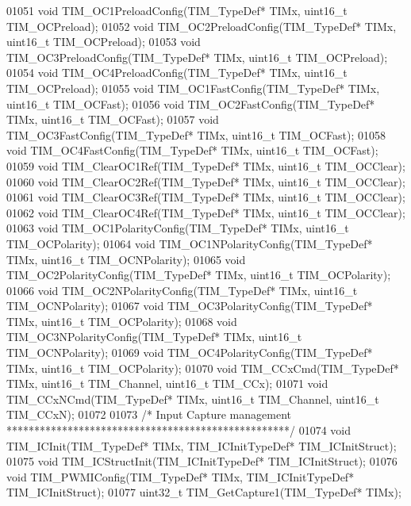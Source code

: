 \begin{DoxyCode}
01051 \textcolor{keywordtype}{void} TIM_OC1PreloadConfig(TIM\_TypeDef* TIMx, uint16\_t TIM\_OCPreload);
01052 \textcolor{keywordtype}{void} TIM_OC2PreloadConfig(TIM\_TypeDef* TIMx, uint16\_t TIM\_OCPreload);
01053 \textcolor{keywordtype}{void} TIM_OC3PreloadConfig(TIM\_TypeDef* TIMx, uint16\_t TIM\_OCPreload);
01054 \textcolor{keywordtype}{void} TIM_OC4PreloadConfig(TIM\_TypeDef* TIMx, uint16\_t TIM\_OCPreload);
01055 \textcolor{keywordtype}{void} TIM_OC1FastConfig(TIM\_TypeDef* TIMx, uint16\_t TIM\_OCFast);
01056 \textcolor{keywordtype}{void} TIM_OC2FastConfig(TIM\_TypeDef* TIMx, uint16\_t TIM\_OCFast);
01057 \textcolor{keywordtype}{void} TIM_OC3FastConfig(TIM\_TypeDef* TIMx, uint16\_t TIM\_OCFast);
01058 \textcolor{keywordtype}{void} TIM_OC4FastConfig(TIM\_TypeDef* TIMx, uint16\_t TIM\_OCFast);
01059 \textcolor{keywordtype}{void} TIM_ClearOC1Ref(TIM\_TypeDef* TIMx, uint16\_t TIM\_OCClear);
01060 \textcolor{keywordtype}{void} TIM_ClearOC2Ref(TIM\_TypeDef* TIMx, uint16\_t TIM\_OCClear);
01061 \textcolor{keywordtype}{void} TIM_ClearOC3Ref(TIM\_TypeDef* TIMx, uint16\_t TIM\_OCClear);
01062 \textcolor{keywordtype}{void} TIM_ClearOC4Ref(TIM\_TypeDef* TIMx, uint16\_t TIM\_OCClear);
01063 \textcolor{keywordtype}{void} TIM_OC1PolarityConfig(TIM\_TypeDef* TIMx, uint16\_t TIM\_OCPolarity);
01064 \textcolor{keywordtype}{void} TIM_OC1NPolarityConfig(TIM\_TypeDef* TIMx, uint16\_t TIM\_OCNPolarity);
01065 \textcolor{keywordtype}{void} TIM_OC2PolarityConfig(TIM\_TypeDef* TIMx, uint16\_t TIM\_OCPolarity);
01066 \textcolor{keywordtype}{void} TIM_OC2NPolarityConfig(TIM\_TypeDef* TIMx, uint16\_t TIM\_OCNPolarity);
01067 \textcolor{keywordtype}{void} TIM_OC3PolarityConfig(TIM\_TypeDef* TIMx, uint16\_t TIM\_OCPolarity);
01068 \textcolor{keywordtype}{void} TIM_OC3NPolarityConfig(TIM\_TypeDef* TIMx, uint16\_t TIM\_OCNPolarity);
01069 \textcolor{keywordtype}{void} TIM_OC4PolarityConfig(TIM\_TypeDef* TIMx, uint16\_t TIM\_OCPolarity);
01070 \textcolor{keywordtype}{void} TIM_CCxCmd(TIM\_TypeDef* TIMx, uint16\_t TIM\_Channel, uint16\_t TIM\_CCx);
01071 \textcolor{keywordtype}{void} TIM_CCxNCmd(TIM\_TypeDef* TIMx, uint16\_t TIM\_Channel, uint16\_t TIM\_CCxN);
01072 
01073 \textcolor{comment}{/* Input Capture management ***************************************************/}
01074 \textcolor{keywordtype}{void} TIM_ICInit(TIM\_TypeDef* TIMx, TIM\_ICInitTypeDef* TIM\_ICInitStruct);
01075 \textcolor{keywordtype}{void} TIM_ICStructInit(TIM\_ICInitTypeDef* TIM\_ICInitStruct);
01076 \textcolor{keywordtype}{void} TIM_PWMIConfig(TIM\_TypeDef* TIMx, TIM\_ICInitTypeDef* TIM\_ICInitStruct);
01077 uint32\_t TIM_GetCapture1(TIM\_TypeDef* TIMx);

\end{DoxyCode}
